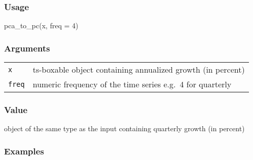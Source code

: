 \documentclass[
  letterpaper,
  DIV=11,
  numbers=noendperiod]{scrreport}
\newenvironment{Shaded}{\begin{snugshade}}{\end{snugshade}}
\newcommand{\AttributeTok}[1]{\textcolor[rgb]{0.40,0.45,0.13}{#1}}
\newcommand{\DecValTok}[1]{\textcolor[rgb]{0.68,0.00,0.00}{#1}}
\newcommand{\FunctionTok}[1]{\textcolor[rgb]{0.28,0.35,0.67}{#1}}
\newcommand{\NormalTok}[1]{\textcolor[rgb]{0.00,0.23,0.31}{#1}}
\begin{document}
\subsubsection{Usage}\label{usage-45}

\begin{Shaded}
\begin{Highlighting}[]
\FunctionTok{pca\_to\_pc}\NormalTok{(x, }\AttributeTok{freq =} \DecValTok{4}\NormalTok{)}
\end{Highlighting}
\end{Shaded}

\subsubsection{Arguments}\label{arguments-45}

\begin{longtable}[]{@{}ll@{}}
\toprule\noalign{}
\endhead
\bottomrule\noalign{}
\endlastfoot
\texttt{x} & ts-boxable object containing annualized growth (in
percent) \\
\texttt{freq} & numeric frequency of the time series e.g.~4 for
quarterly \\
\end{longtable}

\subsubsection{Value}\label{value-45}

object of the same type as the input containing quarterly growth (in
percent)

\subsubsection{Examples}\label{examples-45}
\end{document}
